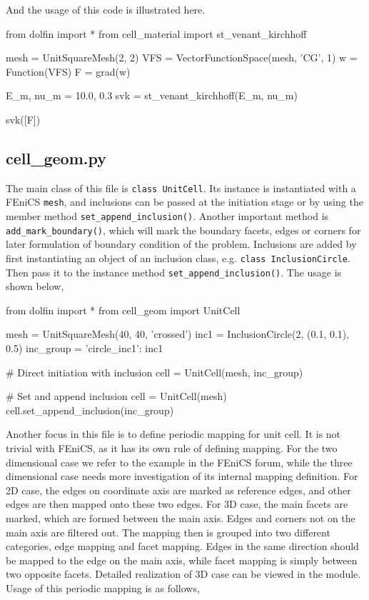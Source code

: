 \documentclass[10pt,a4paper]{scrreprt}
\begin{document}
And the usage of this code is illustrated here.
\begin{python}
from dolfin import *
from cell_material import st_venant_kirchhoff

mesh = UnitSquareMesh(2, 2)
VFS = VectorFunctionSpace(mesh, 'CG', 1)
w = Function(VFS)
F = grad(w)

E_m, nu_m = 10.0, 0.3
svk = st_venant_kirchhoff(E_m, nu_m)

svk([F])
\end{python}

\subsection{cell\_geom.py}
The main class of this file is \texttt{class UnitCell}. Its instance is instantiated with a FEniCS \texttt{mesh}, and inclusions can be passed at the initiation stage or by using the member method \texttt{set\_append\_inclusion()}. Another important method is \texttt{add\_mark\_boundary()}, which will mark the boundary facets, edges or corners for later formulation of boundary condition of the problem. Inclusions are added by first instantiating an object of an inclusion class, e.g. \texttt{class InclusionCircle}. Then pass it to the instance method \texttt{set\_append\_inclusion()}. The usage is shown below,

\begin{python}
from dolfin import *
from cell_geom import UnitCell

mesh = UnitSquareMesh(40, 40, 'crossed')
inc1 = InclusionCircle(2, (0.1, 0.1), 0.5)
inc_group = {'circle_inc1': inc1}

# Direct initiation with inclusion
cell = UnitCell(mesh, inc_group)

# Set and append inclusion
cell = UnitCell(mesh)
cell.set_append_inclusion(inc_group)
\end{python}

Another focus in this file is to define periodic mapping for unit cell. It is not trivial with FEniCS, as it has its own rule of defining mapping. For the two dimensional case we refer to the example in the FEniCS forum, while the three dimensional case needs more investigation of its internal mapping definition. For 2D case, the edges on coordinate axis are marked as reference edges, and other edges are then mapped onto these two edges. For 3D case, the main facets are marked, which are formed between the main axis. Edges and corners not on the main axis are filtered out. The mapping then is grouped into two different categories, edge mapping and facet mapping. Edges in the same direction should be mapped to the edge on the main axis, while facet mapping is simply between two opposite facets. Detailed realization of 3D case can be viewed in the module. Usage of this periodic mapping is as follows,
\end{document}
